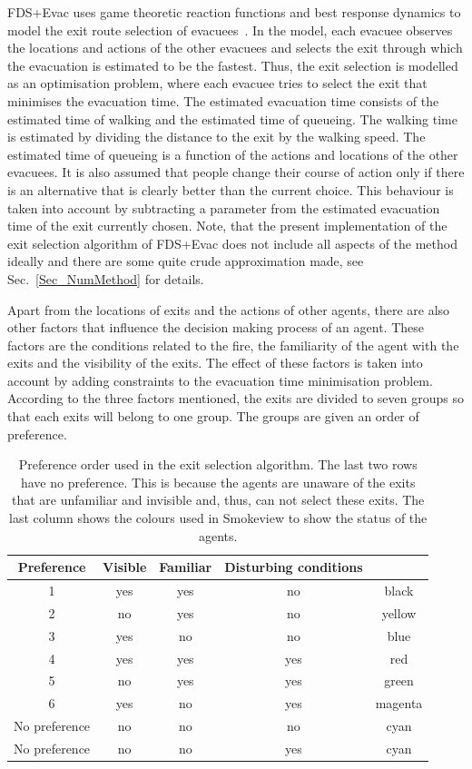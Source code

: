 \documentclass[12pt,a4paper,final,twoside]{stylevk}
\begin{document}
\noindent FDS+Evac uses game theoretic reaction functions and best
response dynamics to model the exit route selection of
evacuees~\cite{Heliovaara07, Heliovaara08}.  In the model, each
evacuee observes the locations and actions of the other evacuees and
selects the exit through which the evacuation is estimated to be the
fastest.  Thus, the exit selection is modelled as an optimisation
problem, where each evacuee tries to select the exit that minimises
the evacuation time.  The estimated evacuation time consists of the
estimated time of walking and the estimated time of queueing.  The
walking time is estimated by dividing the distance to the exit by the
walking speed.  The estimated time of queueing is a function of the
actions and locations of the other evacuees.  It is also assumed that
people change their course of action only if there is an alternative
that is clearly better than the current choice.  This behaviour is
taken into account by subtracting a parameter from the estimated
evacuation time of the exit currently chosen.  Note, that the present
implementation of the exit selection algorithm of FDS+Evac does not
include all aspects of the method ideally and there are some quite
crude approximation made, see Sec.~\ref{Sec_NumMethod} for details.


Apart from the locations of exits and the actions of other agents,
there are also other factors that influence the decision making
process of an agent.  These factors are the conditions related to the
fire, the familiarity of the agent with the exits and the visibility
of the exits.  The effect of these factors is taken into account by
adding constraints to the evacuation time minimisation problem.
According to the three factors mentioned, the exits are divided to
seven groups so that each exits will belong to one group.  The groups
are given an order of preference.

%
\begin{table}[!b]
\begin{center}
\caption{Preference order used in the exit selection algorithm.  The 
last two rows have no preference.  This is because the agents are
unaware of the exits that are unfamiliar and invisible and, thus,
can not select these exits.  The last column shows the colours used in
Smokeview to show the status of the agents.}\label{Table_pref_order}
\vspace{12pt}
\begin{tabular}{c|c|c|c|c} \hline \hline
Preference&Visible&Familiar&Disturbing conditions\\ \hline 
1&yes&yes&no&black\\ \hline
2&no&yes&no&yellow\\ \hline 
3&yes&no&no&blue\\ \hline 
4&yes&yes&yes&red\\ \hline 
5&no&yes&yes&green\\ \hline 
6&yes&no&yes&magenta\\ \hline 
No preference&no&no&no&cyan\\ \hline 
No preference&no&no&yes&cyan\\ \hline \hline
\end{tabular}
\end{center}
\end{table}
%
\end{document}
